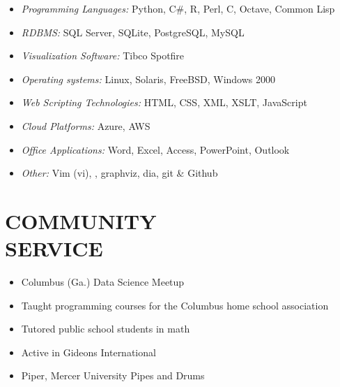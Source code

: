 \documentclass[margin, 10pt]{res} %
\begin{document}
\begin{resume}
\begin{itemize} \itemsep -2pt %

\item {\it Programming Languages:} Python, C\#, \textsf{R}, Perl, C,  Octave, Common Lisp
\item {\it RDBMS:} SQL Server, SQLite, PostgreSQL, MySQL 
\item {\it Visualization Software:} Tibco Spotfire
\item {\it Operating systems:} Linux, Solaris, FreeBSD, Windows 2000
\item {\it Web Scripting Technologies:} HTML, CSS, XML, XSLT, JavaScript
\item {\it Cloud Platforms:} Azure, AWS
\item {\it Office Applications:} Word, Excel, Access, PowerPoint, Outlook
\item {\it Other:} Vim (vi), \LaTeXe, graphviz, dia, git \& Github
\end{itemize}

 


\section{COMMUNITY \\ SERVICE}

\begin{itemize} \itemsep -2pt %
    \item Columbus (Ga.) Data Science Meetup
    \item Taught programming courses for the Columbus home school association
    \item Tutored public school students in math
    \item Active in Gideons International
    \item Piper, Mercer University Pipes and Drums
\end{itemize}


\end{resume}
\end{document}
